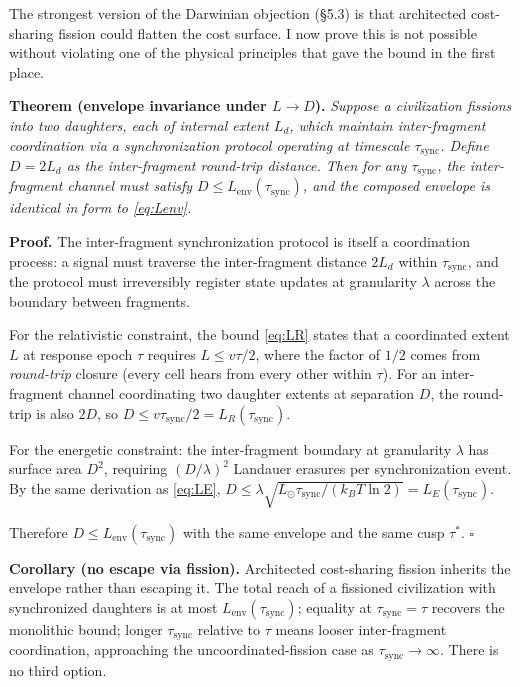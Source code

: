 \documentclass[11pt,twocolumn]{article}
\newcommand{\Lenv}{L_{\text{env}}}
\newcommand{\LR}{L_R}
\newcommand{\LE}{L_E}
\newcommand{\taustar}{{\tau^{*}}}
\newcommand{\kBT}{k_{B}T}
\newcommand{\Lsun}{L_{\odot}}
\begin{document}
The strongest version of the Darwinian objection (\S 5.3) is that
architected cost-sharing fission could flatten the cost surface. I now
prove this is not possible without violating one of the physical principles
that gave the bound in the first place.

\textbf{Theorem (envelope invariance under $L \to D$).} \emph{Suppose a
civilization fissions into two daughters, each of internal extent $L_{d}$,
which maintain inter-fragment coordination via a synchronization protocol
operating at timescale $\tau_{\text{sync}}$. Define $D = 2L_{d}$ as the
inter-fragment round-trip distance. Then for any $\tau_{\text{sync}}$,
the inter-fragment channel must satisfy $D \le \Lenv(\tau_{\text{sync}})$,
and the composed envelope is identical in form to \eqref{eq:Lenv}.}

\textbf{Proof.} The inter-fragment synchronization protocol is itself a
coordination process: a signal must traverse the inter-fragment distance
$2L_{d}$ within $\tau_{\text{sync}}$, and the protocol must irreversibly
register state updates at granularity $\lambda$ across the boundary
between fragments.

For the relativistic constraint, the bound \eqref{eq:LR} states that a
coordinated extent $L$ at response epoch $\tau$ requires $L \le v\tau/2$,
where the factor of $1/2$ comes from \emph{round-trip} closure (every
cell hears from every other within $\tau$). For an inter-fragment
channel coordinating two daughter extents at separation $D$, the
round-trip is also $2D$, so $D \le v\tau_{\text{sync}}/2 =
\LR(\tau_{\text{sync}})$.

For the energetic constraint: the inter-fragment boundary at granularity
$\lambda$ has surface area $D^{2}$, requiring $(D/\lambda)^{2}$ Landauer
erasures per synchronization event. By the same derivation as
\eqref{eq:LE}, $D \le \lambda\sqrt{\Lsun\tau_{\text{sync}}/(\kBT \ln 2)}
= \LE(\tau_{\text{sync}})$.

Therefore $D \le \Lenv(\tau_{\text{sync}})$ with the same envelope and the
same cusp $\taustar$. \hfill$\square$

\textbf{Corollary (no escape via fission).} Architected cost-sharing
fission inherits the envelope rather than escaping it. The total reach of
a fissioned civilization with synchronized daughters is at most
$\Lenv(\tau_{\text{sync}})$; equality at $\tau_{\text{sync}} = \tau$
recovers the monolithic bound; longer $\tau_{\text{sync}}$ relative to
$\tau$ means looser inter-fragment coordination, approaching the
uncoordinated-fission case as $\tau_{\text{sync}} \to \infty$. There is
no third option.
\end{document}

